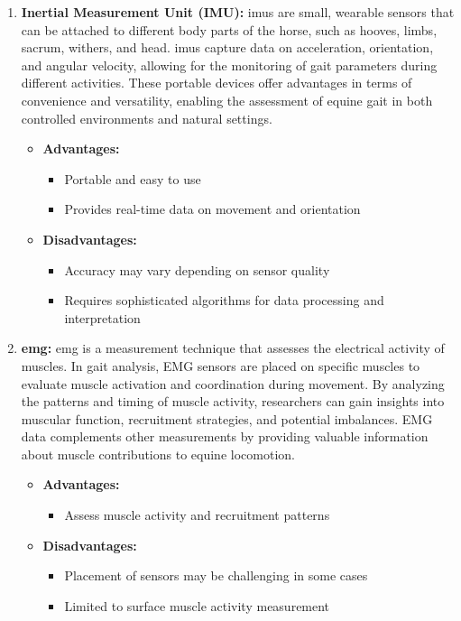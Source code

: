\begin{enumerate}
\item \textbf{Inertial Measurement Unit (IMU):} \gls{imu}s are small, wearable sensors that can be attached to different body parts of the horse, such as hooves, limbs, sacrum, withers, and head. \gls{imu}s capture data on acceleration, orientation, and angular velocity, allowing for the monitoring of gait parameters during different activities. These portable devices offer advantages in terms of convenience and versatility, enabling the assessment of equine gait in both controlled environments and natural settings.
\begin{itemize}
\item[] \textbf{\small Advantages:}
\begin{itemize}
\item Portable and easy to use
\item Provides real-time data on movement and orientation
\end{itemize}
\item[] \textbf{\small Disadvantages:}
\begin{itemize}
\item Accuracy may vary depending on sensor quality
\item Requires sophisticated algorithms for data processing and interpretation
\end{itemize}
\end{itemize}

\item \textbf{\gls{emg}:} \gls{emg} is a measurement technique that assesses the electrical activity of muscles. In gait analysis, EMG sensors are placed on specific muscles to evaluate muscle activation and coordination during movement. By analyzing the patterns and timing of muscle activity, researchers can gain insights into muscular function, recruitment strategies, and potential imbalances. EMG data complements other measurements by providing valuable information about muscle contributions to equine locomotion.
\begin{itemize}
\item[] \textbf{\small Advantages:}
\begin{itemize}
\item Assess muscle activity and recruitment patterns
\end{itemize}
\item[] \textbf{\small Disadvantages:}
\begin{itemize}
\item Placement of sensors may be challenging in some cases
\item Limited to surface muscle activity measurement
\end{itemize}
\end{itemize}


\end{enumerate}
